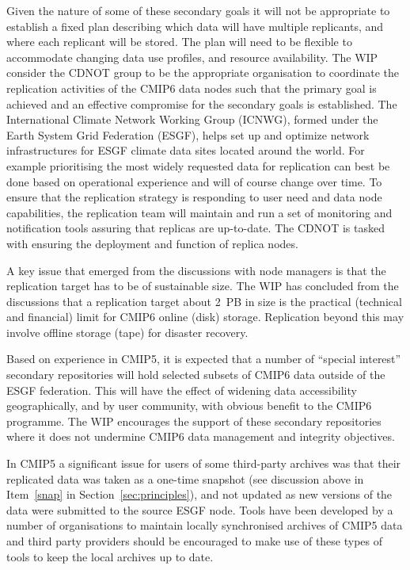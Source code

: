 \documentclass[gmd,manuscript]{copernicus}
\newcommand{\secref}[1] {\mbox{Section  \ref{sec:#1}}}
\begin{document}
Given the nature of some of these secondary goals it will not be
appropriate to establish a fixed plan describing which data will have
multiple replicants, and where each replicant will be stored. The plan
will need to be flexible to accommodate changing data use profiles,
and resource availability. The WIP consider the CDNOT group to be the
appropriate organisation to coordinate the replication activities of
the CMIP6 data nodes such that the primary goal is achieved and an
effective compromise for the secondary goals is established. The
International Climate Network Working Group (ICNWG), formed under the
Earth System Grid Federation (ESGF), helps set up and optimize network
infrastructures for ESGF climate data sites located around the world.
For example prioritising the most widely requested data for
replication can best be done based on operational experience and will
of course change over time. To ensure that the replication strategy is
responding to user need and data node capabilities, the replication
team will maintain and run a set of monitoring and notification tools
assuring that replicas are up-to-date. The CDNOT is tasked with
ensuring the deployment and function of replica nodes.

A key issue that emerged from the discussions with node managers is
that the replication target has to be of sustainable size. The WIP has
concluded from the discussions that a replication target about 2~PB in
size is the practical (technical and financial) limit for CMIP6 online
(disk) storage. Replication beyond this may involve offline storage
(tape) for disaster recovery.

Based on experience in CMIP5, it is expected that a number of
``special interest'' secondary repositories will hold selected subsets
of CMIP6 data outside of the ESGF federation. This will have the
effect of widening data accessibility geographically, and by user
community, with obvious benefit to the CMIP6 programme. The WIP
encourages the support of these secondary repositories where it
does not undermine CMIP6 data management and integrity objectives.

In CMIP5 a significant issue for users of some third-party archives
was that their replicated data was taken as a one-time snapshot (see
discussion above in Item~\ref{snap} in \secref{principles}), and not
updated as new versions of the data were submitted to the source ESGF
node. Tools have been developed by a number of organisations to
maintain locally synchronised archives of CMIP5 data and third party
providers should be encouraged to make use of these types of tools to
keep the local archives up to date.
\end{document}
